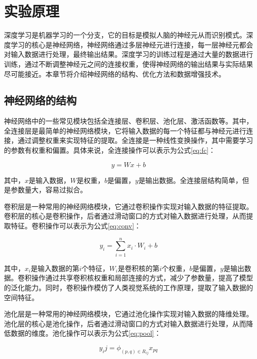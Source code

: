 \section{实验原理}

深度学习是机器学习的一个分支，它的目标是模拟人脑的神经元从而识别模式。深度学习的核心是神经网络，神经网络通过多层神经元进行连接，每一层神经元都会对输入数据进行处理，最终输出结果。深度学习的训练过程是通过大量的数据进行训练，通过不断调整神经元之间的连接权重，使得神经网络的输出结果与实际结果尽可能接近。本章节将介绍神经网络的结构、优化方法和数据增强技术。

\subsection{神经网络的结构}

神经网络中的一些常见模块包括全连接层、卷积层、池化层、激活函数等。其中，全连接层是最简单的神经网络模块，它将输入数据的每一个特征都与神经元进行连接，通过调整权重来实现特征的提取。全连接是一种线性变换操作，其中需要学习的参数有权重和偏置。具体来说，全连接操作可以表示为公式\ref{eq:fc}：

\begin{equation}
    y = Wx + b
    \label{eq:fc}
\end{equation}

其中，$x$是输入数据，$W$是权重，$b$是偏置，$y$是输出数据。全连接层结构简单，但是参数量大，容易过拟合。

卷积层是一种常用的神经网络模块，它通过卷积操作实现对输入数据的特征提取。卷积层的核心是卷积操作，后者通过滑动窗口的方式对输入数据进行处理，从而提取特征。卷积操作可以表示为公式\ref{eq:conv}：

\begin{equation}
    y_i = \sum_{i=1}^{n} x_i \cdot W_i + b
    \label{eq:conv}
\end{equation}

其中，$x_i$是输入数据的第$i$个特征，$W_i$是卷积核的第$i$个权重，$b$是偏置，$y$是输出数据。卷积操作通过共享卷积核权重和局部连接的方式，减少了参数量，提高了模型的泛化能力。同时，卷积操作模仿了人类视觉系统的工作原理，提取了输入数据的空间特征。

池化层是一种常用的神经网络模块，它通过池化操作实现对输入数据的降维处理。池化层的核心是池化操作，后者通过滑动窗口的方式对输入数据进行处理，从而降低数据的维度。池化操作可以表示为公式\ref{eq:pool}：

\begin{equation}
    y_ij = \phi_{(p,q)\in R_{ij}} x_{pq}
    \label{eq:pool}
\end{equation}

